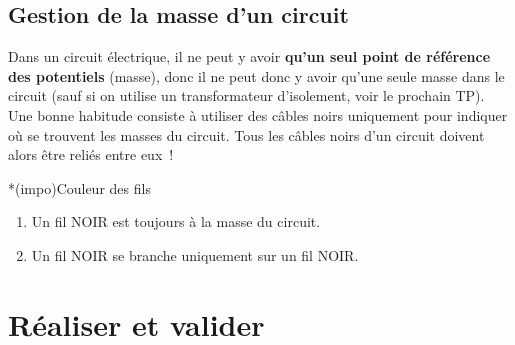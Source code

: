 \documentclass[../main/main.tex]{subfiles}
\begin{document}
{	\subsection{Gestion de la masse d'un circuit}

	Dans un circuit électrique, il ne peut y avoir \textbf{qu'un seul point de
		référence des potentiels} (masse), donc il ne peut donc y avoir qu'une seule
	masse dans le circuit (sauf si on utilise un transformateur d'isolement, voir
	le prochain TP). Une bonne habitude consiste à utiliser des câbles noirs
	uniquement pour indiquer où se trouvent les masses du circuit. Tous les câbles
	noirs d'un circuit doivent alors être reliés entre eux~!

	\begin{tcb}*(impo){Couleur des fils}
		\begin{enumerate}
			\item Un fil NOIR est toujours à la masse du circuit.
			\item Un fil NOIR se branche uniquement sur un fil NOIR.
		\end{enumerate}
	\end{tcb}
}

\section{Réaliser et valider}
%
\end{document}
